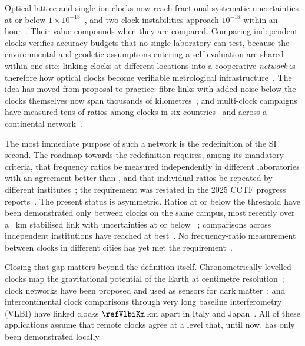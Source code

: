 Optical lattice and single-ion clocks now reach fractional systematic
uncertainties at or below $1\times10^{-18}$~\citep{arnold2026lu,
zhang2026ca}, and two-clock instabilities approach $10^{-18}$ within an
hour~\citep{oelker2019stability}. Their value compounds when they are
compared. Comparing independent clocks verifies accuracy budgets that no
single laboratory can test, because the environmental and geodetic
assumptions entering a self-evaluation are shared within one site; linking
clocks at different locations into a cooperative \emph{network} is
therefore how optical clocks become verifiable metrological
infrastructure~\citep{riehle2017networks, komar2014quantumnetwork}. The
idea has moved from proposal to practice: fibre links with added noise below
the clocks themselves now span thousands of
kilometres~\citep{schioppo2022cavities, chen2026dissemination}, and
multi-clock campaigns have measured tens of ratios among
clocks in six countries~\citep{lindvall2025coordinated} and across a
continental network~\citep{pizzocaro2026european}.

The most immediate purpose of such a network is the redefinition of the SI
second. The roadmap towards the redefinition requires, among its mandatory
criteria, that frequency ratios be measured independently in different
laboratories with an agreement better than , and that
individual ratios be repeated by different
institutes~\citep{dimarcq2024roadmap}; the requirement was restated in the
2025 CCTF progress
reports~\citep{cctf2025strategy, cctf2025taskforce}. The present status is
asymmetric. Ratios at or below the threshold have been demonstrated only
between clocks on the same campus, most recently over a
~km stabilised link with uncertainties at or below
~\citep{aeppli2026nist}; comparisons across independent
institutions have reached  at
best~\citep{pizzocaro2026european}. No frequency-ratio measurement between
clocks in different cities has yet met the
requirement~\citep{fortier2026review}.

Closing that gap matters beyond the definition itself. Chronometrically
levelled clocks map the gravitational potential of the Earth at centimetre
resolution~\citep{grotti2018geodesy, takamoto2020redshift, mcgrew2018geodesy};
clock networks have been proposed and used as sensors for dark
matter~\citep{derevianko2014topological, wcislo2018global}; and
intercontinental clock comparisons through very long baseline
interferometry (VLBI) have linked clocks $\refVlbiKm$\,km apart in Italy
and Japan~\citep{pizzocaro2021vlbi}. All of these applications assume that
remote clocks agree at a level that, until now, has only been demonstrated
locally.

